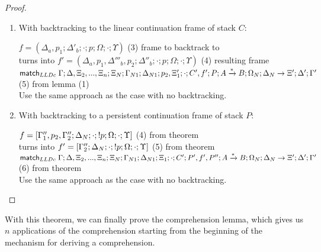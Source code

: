 \begin{proof}
\begin{itemize}
\begin{enumerate}
      \item With backtracking to the linear continuation frame of stack $C$:
      
      {\footnotesize
      
      $f = (\Delta_a, p_1; \Delta'_b; \cdot; p; \Omega; \cdot; \Upsilon)$ \hfill (3) frame to backtrack to \\
      turns into $f' = (\Delta_a, p_1, \Delta'''_b, p_2; \Delta''_b; \cdot; p; \Omega; \cdot; \Upsilon)$ \hfill (4) resulting frame \\
      $\mathsf{match}_{LLDc} \; \Gamma; \Delta, \Xi_2, ..., \Xi_n; \Xi_N; \Gamma_{N1}; \Delta_{N1}; p_2, \Xi'_1; \cdot; C', f'; P; A \xrightarrow{*} B; \Omega_N; \Delta_N \rightarrow \Xi'; \Delta'; \Gamma'$ \hfill (5) from lemma (1) \\
      
      Use the same approach as the case with no backtracking.\\
      
      }
      
      \item With backtracking to a persistent continuation frame of stack $P$:

      {\footnotesize 

      $f = [\Gamma''_1, p_2, \Gamma''_2; \Delta_N; \cdot; {!} p; \Omega; \cdot; \Upsilon]$ \hfill (4) from theorem \\
      turns into $f' = [\Gamma''_2; \Delta_N; \cdot; {!} p; \Omega; \cdot; \Upsilon]$ \hfill (5) from theorem \\
      $\mathsf{match}_{LLDc} \; \Gamma; \Delta, \Xi_2, ..., \Xi_n; \Xi_N; \Gamma_{N1}; \Delta_{N1}; \Xi_1; \cdot; C'; P', f', P''; A \xrightarrow{*} B; \Omega_N; \Delta_N \rightarrow \Xi'; \Delta'; \Gamma'$ \hfill (6) from theorem \\
         
      Use the same approach as the case with no backtracking.\\

      }
      
   \end{enumerate}
\end{itemize}
\end{proof}

With this theorem, we can finally prove the comprehension lemma, which gives us $n$ applications
of the comprehension starting from the beginning of the mechanism for deriving a comprehension.

